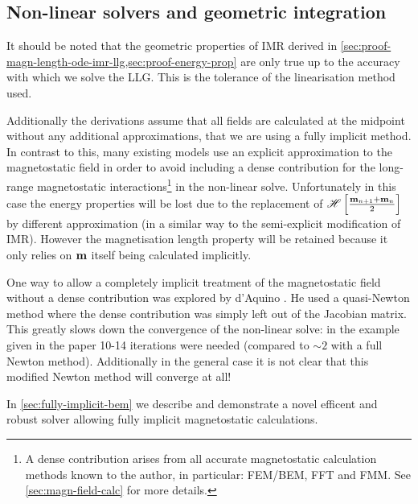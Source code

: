\subsection{Non-linear solvers and geometric integration}

It should be noted that the geometric properties of IMR derived in \cref{sec:proof-magn-length-ode-imr-llg,sec:proof-energy-prop} are only true up to the accuracy with which we solve the LLG.
This is the tolerance of the linearisation method used. 

Additionally the derivations assume that all fields are calculated at the midpoint without any additional approximations, \ie that we are using a fully implicit method.
In contrast to this, many existing models use an explicit approximation to the magnetostatic field in order to avoid including a dense contribution for the long-range magnetostatic interactions\footnote{A dense contribution arises from all accurate magnetostatic calculation methods known to the author, in particular: FEM/BEM, FFT and FMM. See \cref{sec:magn-field-calc} for more details.} in the non-linear solve.
Unfortunately in this case the energy properties will be lost due to the replacement of $\mathscr{H} \left[ \frac{\mathbf{m}_{n+1} + \mathbf{m}_n}{2} \right]$ by different approximation (in a similar way to the semi-explicit modification of IMR).
However the magnetisation length property will be retained because it only relies on $\mathbf{m}$ itself being calculated implicitly.

One way to allow a completely implicit treatment of the magnetostatic field without a dense contribution was explored by d'Aquino \cite{DAquino2005}.
He used a quasi-Newton method where the dense contribution was simply left out of the Jacobian matrix.
This greatly slows down the convergence of the non-linear solve: in the example given in the paper 10-14 iterations were needed (compared to $\sim2$ with a full Newton method).
Additionally in the general case it is not clear that this modified Newton method will converge at all!

In \cref{sec:fully-implicit-bem} we describe and demonstrate a novel efficent and robust solver allowing fully implicit magnetostatic calculations.




